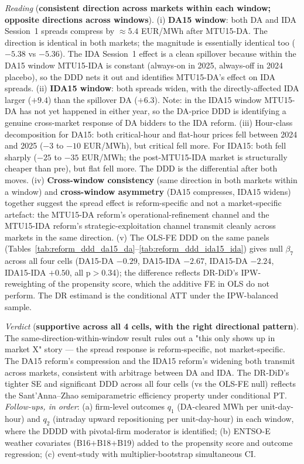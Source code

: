 \documentclass[11pt,a4paper]{article}
\begin{document}
\textit{Reading} (\textbf{consistent direction across markets within each window; opposite directions across windows}). (i) \textbf{DA15 window}: both DA and IDA Session~1 spreads compress by $\approx 5.4$ EUR/MWh after MTU15-DA. The direction is identical in both markets; the magnitude is essentially identical too ($-5.38$ vs $-5.36$). The IDA Session~1 effect is a clean spillover because within the DA15 window MTU15-IDA is constant (always-on in 2025, always-off in 2024 placebo), so the DDD nets it out and identifies MTU15-DA's effect on IDA spreads. (ii) \textbf{IDA15 window}: both spreads widen, with the directly-affected IDA larger ($+9.4$) than the spillover DA ($+6.3$). Note: in the IDA15 window MTU15-DA has not yet happened in either year, so the DA-price DDD is identifying a genuine cross-market response of DA bidders to the IDA reform. (iii) Hour-class decomposition for DA15: both critical-hour and flat-hour prices fell between 2024 and 2025 ($-3$ to $-10$ EUR/MWh), but critical fell more. For IDA15: both fell sharply ($-25$ to $-35$ EUR/MWh; the post-MTU15-IDA market is structurally cheaper than pre), but flat fell more. The DDD is the differential after both moves. (iv) \textbf{Cross-window consistency} (same direction in both markets within a window) and \textbf{cross-window asymmetry} (DA15 compresses, IDA15 widens) together suggest the spread effect is reform-specific and not a market-specific artefact: the MTU15-DA reform's operational-refinement channel and the MTU15-IDA reform's strategic-exploitation channel transmit cleanly across markets in the same direction. (v) The OLS-FE DDD on the same panels (Tables~\ref{tab:reform_ddd_da15_da}--\ref{tab:reform_ddd_ida15_ida}) gives null $\beta_7$ across all four cells (DA15-DA $-0.29$, DA15-IDA $-2.67$, IDA15-DA $-2.24$, IDA15-IDA $+0.50$, all p$>$0.34); the difference reflects DR-DiD's IPW-reweighting of the propensity score, which the additive FE in OLS do not perform. The DR estimand is the conditional ATT under the IPW-balanced sample.

\textit{Verdict} (\textbf{supportive across all 4 cells, with the right directional pattern}). The same-direction-within-window result rules out a "this only shows up in market X" story --- the spread response is reform-specific, not market-specific. The DA15 reform's compression and the IDA15 reform's widening both transmit across markets, consistent with arbitrage between DA and IDA. The DR-DiD's tighter SE and significant DDD across all four cells (vs the OLS-FE null) reflects the Sant'Anna--Zhao semiparametric efficiency property under conditional PT. \emph{Follow-ups, in order}: (a) firm-level outcomes $q_1$ (DA-cleared MWh per unit-day-hour) and $q_2$ (intraday upward repositioning per unit-day-hour) in each window, where the DDDD with pivotal-firm moderator is identified; (b) ENTSO-E weather covariates (B16$+$B18$+$B19) added to the propensity score and outcome regression; (c) event-study with multiplier-bootstrap simultaneous CI.
\end{document}
